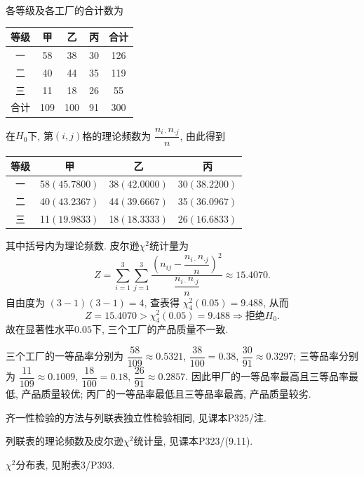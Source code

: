 \documentclass[standard]{ExBook}
\begin{document}
\begin{qitems}
各等级及各工厂的合计数为
\begin{center}
\setlength{\tabcolsep}{33pt}
\begin{tabular}{c|ccc|c}
\hline
等级 & 甲 & 乙 & 丙 & 合计\\
\hline
一 & 58 & 38 & 30 & 126\\
二 & 40 & 44 & 35 & 119\\
三 & 11 & 18 & 26 & 55\\
\hline
合计 & 109 & 100 & 91 & 300\\
\hline
\end{tabular}
\end{center}
在$H_0$下, 第$(i,j)$格的理论频数为
$
\dfrac{n_{i\cdot}n_{\cdot j}}{n}
$,
由此得到
\begin{center}
\setlength{\tabcolsep}{26pt}
\begin{tabular}{c|ccc}
\hline
等级 & 甲 & 乙 & 丙\\
\hline
一 & 58$(45.7800)$ & 38$(42.0000)$ & 30$(38.2200)$\\
二 & 40$(43.2367)$ & 44$(39.6667)$ & 35$(36.0967)$\\
三 & 11$(19.9833)$ & 18$(18.3333)$ & 26$(16.6833)$\\
\hline
\end{tabular}
\end{center}
其中括号内为理论频数. 皮尔逊$\chi^2$统计量为
$$
Z
=\sum_{i=1}^{3}\sum_{j=1}^{3}
\frac{\left(n_{ij}-\dfrac{n_{i\cdot}n_{\cdot j}}{n}\right)^2}
{\dfrac{n_{i\cdot}n_{\cdot j}}{n}}
\approx15.4070.
$$
自由度为
$
(3-1)(3-1)=4
$,
查表得
$
\chi_4^2(0.05)=9.488
$,
从而
$$
Z=15.4070>\chi_4^2(0.05)=9.488
\Longrightarrow
\text{拒绝}H_0.
$$
故在显著性水平$0.05$下, 三个工厂的产品质量不一致.

三个工厂的一等品率分别为
$
\dfrac{58}{109}\approx0.5321
$,
$
\dfrac{38}{100}=0.38
$,
$
\dfrac{30}{91}\approx0.3297
$;
三等品率分别为
$
\dfrac{11}{109}\approx0.1009
$,
$
\dfrac{18}{100}=0.18
$,
$
\dfrac{26}{91}\approx0.2857
$.
因此甲厂的一等品率最高且三等品率最低, 产品质量较优; 丙厂的一等品率最低且三等品率最高, 产品质量较劣.

\textcolor{themeColor}{\selectfont {} 齐一性检验的方法与列联表独立性检验相同, 见课本P325/注.}

\textcolor{themeColor}{\selectfont {} 列联表的理论频数及皮尔逊$\chi^2$统计量, 见课本P323/(9.11).}

\textcolor{themeColor}{\selectfont {} $\chi^2$分布表, 见附表3/P393.}

\vspace{2.5cm-5em}


\end{qitems}
\end{document}
